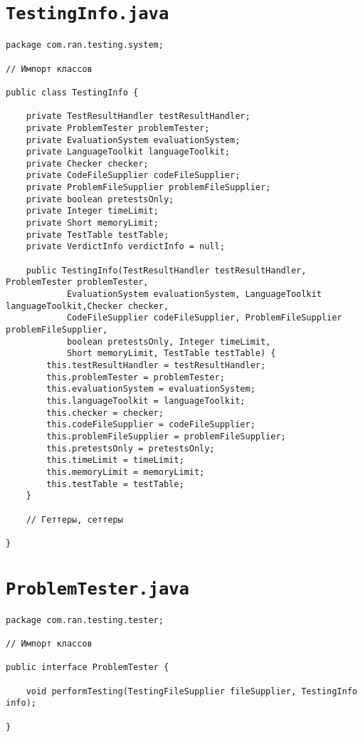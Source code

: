 \section*{\texttt{TestingInfo.java}}
\begin{verbatim}
package com.ran.testing.system;

// Импорт классов

public class TestingInfo {

    private TestResultHandler testResultHandler;
    private ProblemTester problemTester;
    private EvaluationSystem evaluationSystem;
    private LanguageToolkit languageToolkit;
    private Checker checker;
    private CodeFileSupplier codeFileSupplier;
    private ProblemFileSupplier problemFileSupplier;
    private boolean pretestsOnly;
    private Integer timeLimit;
    private Short memoryLimit;
    private TestTable testTable;
    private VerdictInfo verdictInfo = null;

    public TestingInfo(TestResultHandler testResultHandler, ProblemTester problemTester,
            EvaluationSystem evaluationSystem, LanguageToolkit languageToolkit,Checker checker,
            CodeFileSupplier codeFileSupplier, ProblemFileSupplier problemFileSupplier,
            boolean pretestsOnly, Integer timeLimit,
            Short memoryLimit, TestTable testTable) {
        this.testResultHandler = testResultHandler;
        this.problemTester = problemTester;
        this.evaluationSystem = evaluationSystem;
        this.languageToolkit = languageToolkit;
        this.checker = checker;
        this.codeFileSupplier = codeFileSupplier;
        this.problemFileSupplier = problemFileSupplier;
        this.pretestsOnly = pretestsOnly;
        this.timeLimit = timeLimit;
        this.memoryLimit = memoryLimit;
        this.testTable = testTable;
    }

    // Геттеры, сеттеры

}
\end{verbatim}

\section*{\texttt{ProblemTester.java}}
\begin{verbatim}
package com.ran.testing.tester;

// Импорт классов

public interface ProblemTester {

    void performTesting(TestingFileSupplier fileSupplier, TestingInfo info);

}
\end{verbatim}

